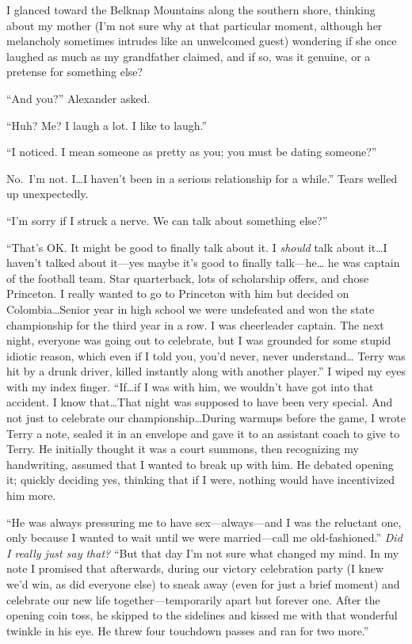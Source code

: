 I glanced toward the Belknap Mountains along the southern shore,
thinking about my mother (I'm not sure why at that particular moment,
although her melancholy sometimes intrudes like an unwelcomed guest)
wondering if she once laughed as much as my grandfather claimed, and if
so, was it genuine, or a pretense for something else?

``And you?'' Alexander asked.

``Huh? Me? I laugh a lot. I like to laugh.''

``I noticed. I mean someone as pretty as you; you must be dating
someone?''

No.~I'm not. I\ldots I haven't been in a serious relationship for a
while.'' Tears welled up unexpectedly.

``I'm sorry if I struck a nerve. We can talk about something else?''

``That's OK. It might be good to finally talk about it. I \emph{should}
talk about it\ldots I haven't talked about it---yes maybe it's good to
finally talk---he\ldots{} he was captain of the football team. Star
quarterback, lots of scholarship offers, and chose Princeton. I really
wanted to go to Princeton with him but decided on Colombia\ldots Senior
year in high school we were undefeated and won the state championship
for the third year in a row. I was cheerleader captain. The next night,
everyone was going out to celebrate, but I was grounded for some stupid
idiotic reason, which even if I told you, you'd never, never
understand\ldots{} Terry was hit by a drunk driver, killed instantly
along with another player.'' I wiped my eyes with my index finger.
``If\ldots if I was with him, we wouldn't have got into that accident. I
know that\ldots That night was supposed to have been very special. And
not just to celebrate our championship\ldots During warmups before the
game, I wrote Terry a note, sealed it in an envelope and gave it to an
assistant coach to give to Terry. He initially thought it was a court
summons, then recognizing my handwriting, assumed that I wanted to break
up with him. He debated opening it; quickly deciding yes, thinking that
if I were, nothing would have incentivized him more.

``He was always pressuring me to have sex---always---and I was the
reluctant one, only because I wanted to wait until we were
married---call me old-fashioned.'' \emph{Did I really just say that?}
``But that day I'm not sure what changed my mind. In my note I promised
that afterwards, during our victory celebration party (I knew we'd win,
as did everyone else) to sneak away (even for just a brief moment) and
celebrate our new life together---temporarily apart but forever one.
After the opening coin toss, he skipped to the sidelines and kissed me
with that wonderful twinkle in his eye. He threw four touchdown passes
and ran for two more.''

